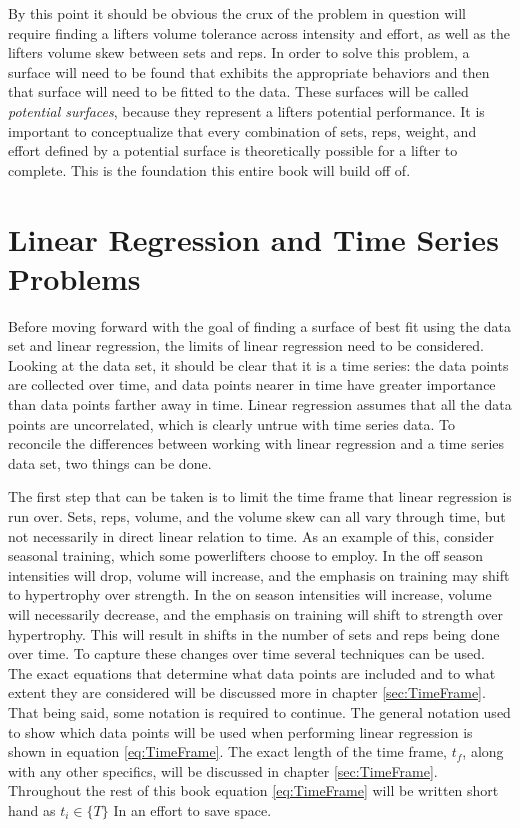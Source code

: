 By this point it should be obvious the crux of the problem in question will require finding a lifters volume tolerance across intensity and effort, as well as the lifters volume skew between sets and reps. In order to solve this problem, a surface will need to be found that exhibits the appropriate behaviors and then that surface will need to be fitted to the data. These surfaces will be called \textit{potential surfaces}, because they represent a lifters potential performance. It is important to conceptualize that every combination of sets, reps, weight, and effort defined by a potential surface is theoretically possible for a lifter to complete. This is the foundation this entire book will build off of.


\section{Linear Regression and Time Series Problems}
\label{sec:PotentialSurfaceLinearRegressionAndTimeSeriesProblems}

Before moving forward with the goal of finding a surface of best fit using the data set and linear regression, the limits of linear regression need to be considered. Looking at the data set, it should be clear that it is a time series: the data points are collected over time, and data points nearer in time have greater importance than data points farther away in time. Linear regression assumes that all the data points are uncorrelated, which is clearly untrue with time series data. To reconcile the differences between working with linear regression and a time series data set, two things can be done.

The first step that can be taken is to limit the time frame that linear regression is run over. Sets, reps, volume, and the volume skew can all vary through time, but not necessarily in direct linear relation to time. As an example of this, consider seasonal training, which some powerlifters choose to employ. In the off season intensities will drop, volume will increase, and the emphasis on training may shift to hypertrophy over strength. In the on season intensities will increase, volume will necessarily decrease, and the emphasis on training will shift to strength over hypertrophy. This will result in shifts in the number of sets and reps being done over time. To capture these changes over time several techniques can be used. The exact equations that determine what data points are included and to what extent they are considered will be discussed more in chapter \ref{sec:TimeFrame}. That being said, some notation is required to continue. The general notation used to show which data points will be used when performing linear regression is shown in equation \ref{eq:TimeFrame}. The exact length of the time frame, $t_f$, along with any other specifics, will be discussed in chapter \ref{sec:TimeFrame}. Throughout the rest of this book equation \ref{eq:TimeFrame} will be written short hand as $t_i\in \{ T \}$ In an effort to save space.

